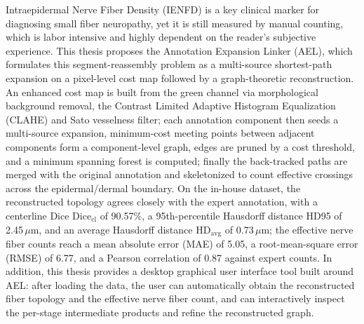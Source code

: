 
\begin{abstract}

表皮內神經纖維密度 (Intraepidermal Nerve Fiber Density, IENFD) 是診斷小纖維神經病變的關鍵臨床指標，然臨床上仍仰賴人工計數，耗時且高度依賴判讀者之主觀經驗。本研究提出標註擴張連結（Annotation Expansion Linker, AEL），將此「線段重組」問題建模為基於像素成本圖之多源最短路徑擴張與圖論重建：先以綠色通道影像經形態學背景消除、對比受限直方圖均衡化 (CLAHE) 與 Sato 線狀結構濾波建構成本圖，再以各標註元件為種子執行多源區域擴張，於相鄰元件之最小成本相遇點構建元件層圖，經成本閾值裁剪後求最小生成森林，最後合併回溯路徑與原標註並骨架化，依表皮／真皮區域統計有效的神經纖維跨越數。在內部資料集中，AEL 重建之纖維拓樸與專家標註高度相符，中心線戴斯係數 $\text{Dice}_{\text{cl}}$ 達 $90.57\%$、第 95 百分位豪斯多夫距離 HD95 為 $2.45\,\mu\text{m}$、平均豪斯多夫距離 $\text{HD}_{\text{avg}}$ 為 $0.73\,\mu\text{m}$；有效神經纖維數相對於人工計數之平均絕對誤差 (MAE) 為 $5.05$、均方根誤差 (RMSE) 為 $6.77$、Pearson 相關係數達 $0.87$。此外，本研究亦提供一套以 AEL 為核心之桌面圖形介面工具，使用者載入資料後即可自動完成纖維拓樸重建與有效神經纖維計數，並可於介面上互動檢視各階段之中介產物及修整重建結果。
\end{abstract}

\begin{abstract*}

Intraepidermal Nerve Fiber Density (IENFD) is a key clinical marker for diagnosing small fiber neuropathy, yet it is still measured by manual counting, which is labor intensive and highly dependent on the reader's subjective experience. This thesis proposes the Annotation Expansion Linker (AEL), which formulates this segment-reassembly problem as a multi-source shortest-path expansion on a pixel-level cost map followed by a graph-theoretic reconstruction. An enhanced cost map is built from the green channel via morphological background removal, the Contrast Limited Adaptive Histogram Equalization (CLAHE) and Sato vesselness filter; each annotation component then seeds a multi-source expansion, minimum-cost meeting points between adjacent components form a component-level graph, edges are pruned by a cost threshold, and a minimum spanning forest is computed; finally the back-tracked paths are merged with the original annotation and skeletonized to count effective crossings across the epidermal/dermal boundary. On the in-house dataset, the reconstructed topology agrees closely with the expert annotation, with a centerline Dice $\text{Dice}_{\text{cl}}$ of 90.57\%, a 95th-percentile Hausdorff distance HD95 of 2.45\,$\mu$m, and an average Hausdorff distance $\text{HD}_{\text{avg}}$ of 0.73\,$\mu$m; the effective nerve fiber counts reach a mean absolute error (MAE) of 5.05, a root-mean-square error (RMSE) of 6.77, and a Pearson correlation of 0.87 against expert counts. In addition, this thesis provides a desktop graphical user interface tool built around AEL: after loading the data, the user can automatically obtain the reconstructed fiber topology and the effective nerve fiber count, and can interactively inspect the per-stage intermediate products and refine the reconstructed graph.

\end{abstract*}
